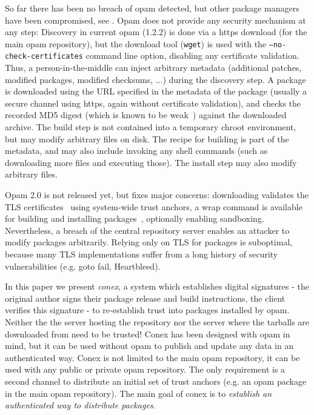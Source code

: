 \documentclass[nocopyrightspace]{sigplanconf}
\begin{document}
So far there has been no breach of opam detected, but other package managers have been compromised, see \cite{cabal,maven,npm,rubygems}.
Opam does not provide any security mechanism at any step:
Discovery in current opam (1.2.2) is done via a https download (for the main opam repository), but the download tool (\texttt{wget}) is used with the \texttt{--no-check-certificates} command line option, disabling any certificate validation.
Thus, a person-in-the-middle can inject arbitrary metadata (additional patches, modified packages, modified checksums, ...) during the discovery step.
A package is downloaded using the URL specified in the metadata of the package (usually a secure channel using https, again without certificate validation), and checks the recorded MD5 digest (which is known to be weak~\cite{rfc6151}) against the downloaded archive.
The build step is not contained into a temporary chroot environment, but may modify arbitrary files on disk.
The recipe for building is part of the metadata, and may also include invoking any shell commands (such as downloading more files and executing those).
The install step may also modify arbitrary files.

Opam 2.0 is not released yet, but fixes major concerns:
downloading validates the TLS certificates~\cite{opampr} using system-wide trust anchors,
a wrap command is available for building and installing packages~\cite{wrappr}, optionally enabling sandboxing.
Nevertheless, a breach of the central repository server enables an attacker to modify packages arbitrarily.
Relying only on TLS for packages is suboptimal, because many TLS implementations suffer from a long history of security vulnerabilities (e.g. goto fail, Heartbleed).

In this paper we present \emph{conex}, a system which establishes digital signatures - the original author signs their package release and build instructions, the client verifies this signature - to re-establish trust into packages installed by opam.
Neither the the server hosting the repository nor the server where the tarballs are downloaded from need to be trusted!
Conex has been designed with opam in mind, but it can be used without opam to publish and update any data in an authenticated way.
Conex is not limited to the main opam repository, it can be used with any public or private opam repository.
The only requirement is a second channel to distribute an initial set of trust anchors (e.g. an opam package in the main opam repository).
The main goal of conex is to \emph{establish an authenticated way to distribute packages}.
\end{document}
